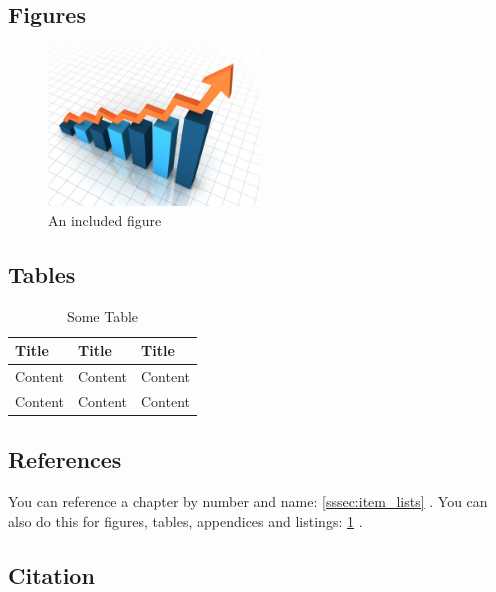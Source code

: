 \subsection{Figures}
\label{ssec:figures}

\begin{figure}[H]
    \begin{center}
        \includegraphics[width=0.5\textwidth]{images/figure.jpg}
        \caption{An included figure}
        \label{fig:figure}
    \end{center}
\end{figure}

\subsection{Tables}
\label{ssec:tables}

\begin{table}[H]
    \centering
    \begin{tabular}{|l|l|l|}
        \hline
            Title   & Title   & Title   \\ \hline
            Content & Content & Content \\ \hline
            Content & Content & Content \\ \hline
    \end{tabular}
    \caption{Some Table}
    \label{tab:some_table}
\end{table}

\subsection{References}
\label{ssec:references}

You can reference a chapter by number and name: \ref{sssec:item_lists} .
\newline
You can also do this for figures, tables, appendices and listings: \ref{fig:figure} .

\subsection{Citation}
\label{ssec:citation}

